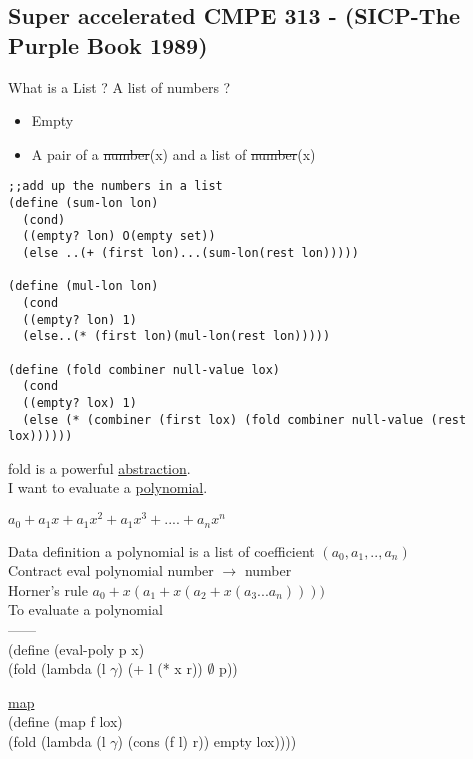\documentclass{article}
\begin{document}
\subsection*{Super accelerated CMPE 313 - (SICP-The Purple Book 1989)}
\begin{flushleft}
What is a List ? A list of numbers ?
\end{flushleft}
\begin{itemize}
\item Empty
\item A pair of a \st{number}(x) and a list of \st{number}(x)
\end{itemize}
\begin{verbatim}
;;add up the numbers in a list
(define (sum-lon lon)
  (cond)
  ((empty? lon) O(empty set))
  (else ..(+ (first lon)...(sum-lon(rest lon)))))
  
(define (mul-lon lon)
  (cond 
  ((empty? lon) 1)
  (else..(* (first lon)(mul-lon(rest lon)))))
  
(define (fold combiner null-value lox)
  (cond
  ((empty? lox) 1)
  (else (* (combiner (first lox) (fold combiner null-value (rest lox))))))
\end{verbatim}

\begin{flushleft}
fold is a powerful \underline{abstraction}.\\
I want to evaluate a \underline{polynomial}.
\end{flushleft}

\begin{center}
${a}_{0} + {a}_{1}x + {a}_{1}{x}^{2} + {a}_{1}{x}^{3} +....+ {a}_{n}{x}^{n}$ 
\end{center}

\begin{flushleft}
Data definition a polynomial is a list of coefficient $({a}_{0},{a}_{1},..,{a}_{n})$\\
Contract eval polynomial number $\rightarrow$ number\\
Horner's rule ${a}_{0} + x({a}_{1} + x({a}_{2} + x({a}_{3}...{a}_{n}))))$\\
To evaluate a polynomial\\
------\\
(define (eval-poly p x)\\
(fold (lambda (l $\gamma$) (+ l (* x r)) $\emptyset$ p))
\end{flushleft}

\begin{flushleft}
\underline{map}\\
(define (map f lox)\\
(fold (lambda (l $\gamma$) (cons (f l) r)) empty lox))))\\
\end{flushleft}
\end{document}
